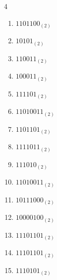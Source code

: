 \begin{multicols}{4}
\begin{enumerate}
        \phantom{$=110$}

  \item $1101100_{(2)}$

        \phantom{$=108$}

\columnbreak %

  \item $10101_{(2)}$

        \phantom{$=21$}

  \item $110011_{(2)}$

        \phantom{$=51$}

  \item $100011_{(2)}$

        \phantom{$=35$}

  \item $111101_{(2)}$

        \phantom{$=61$}

  \item $11010011_{(2)}$

        \phantom{$=211$}

  \item $1101101_{(2)}$

        \phantom{$=109$}

  \item $1111011_{(2)}$

        \phantom{$=123$}

  \item $111010_{(2)}$

        \phantom{$=58$}

  \item $11010011_{(2)}$

        \phantom{$=211$}

  \item $10111000_{(2)}$

        \phantom{$=184$}

  \item $10000100_{(2)}$

        \phantom{$=132$}

  \item $11101101_{(2)}$

        \phantom{$=237$}

  \item $11101101_{(2)}$

        \phantom{$=237$}

  \item $1110101_{(2)}$


\end{enumerate}
\end{multicols}
